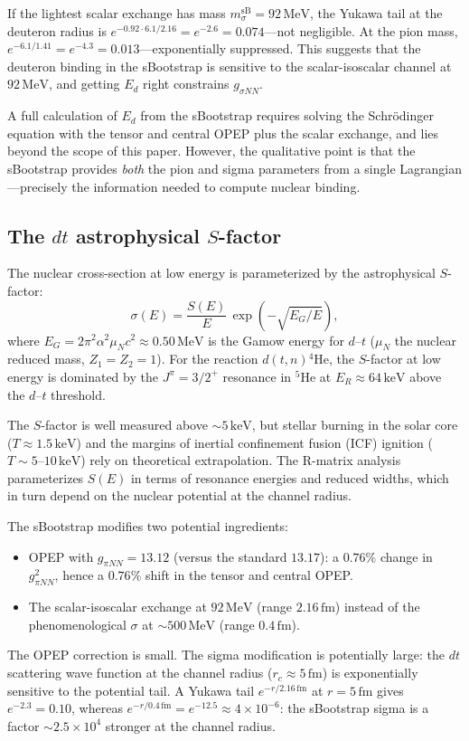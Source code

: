 \documentclass[12pt,a4paper]{article}
\newcommand{\MeV}{\,\text{MeV}}
\newcommand{\keV}{\,\text{keV}}
\begin{document}
If the lightest scalar exchange has mass $m_\sigma^{\text{sB}} = 92\MeV$,
the Yukawa tail at the deuteron radius is $e^{-0.92 \cdot 6.1/2.16}
= e^{-2.6} = 0.074$---not negligible.  At the pion mass,
$e^{-6.1/1.41} = e^{-4.3} = 0.013$---exponentially suppressed.
This suggests that the deuteron binding in the sBootstrap is sensitive
to the scalar-isoscalar channel at $92\MeV$, and getting $E_d$ right
constrains $g_{\sigma NN}$.

A full calculation of $E_d$ from the sBootstrap requires solving the
Schr\"odinger equation with the tensor and central OPEP plus the
scalar exchange, and lies beyond the scope of this paper.  However,
the qualitative point is that the sBootstrap provides \emph{both}
the pion and sigma parameters from a single Lagrangian---precisely the
information needed to compute nuclear binding.

\subsection{The $dt$ astrophysical $S$-factor}

The nuclear cross-section at low energy is parameterized by the
astrophysical $S$-factor:
\begin{equation}
  \sigma(E) = \frac{S(E)}{E}\,\exp\!\left(-\sqrt{E_G/E}\right),
\end{equation}
where $E_G = 2\pi^2 \alpha^2 \mu_N c^2 \approx 0.50\MeV$ is the
Gamow energy for $d$--$t$ ($\mu_N$ the nuclear reduced mass,
$Z_1 = Z_2 = 1$).  For the reaction
$d(t,n){}^4\text{He}$, the $S$-factor at low energy is dominated
by the $J^\pi = 3/2^+$ resonance in ${}^5\text{He}$ at
$E_R \approx 64\keV$ above the $d$--$t$ threshold.

The $S$-factor is well measured above $\sim 5\keV$, but stellar
burning in the solar core ($T \approx 1.5\keV$) and the margins of
inertial confinement fusion (ICF) ignition ($T \sim 5$--$10\keV$)
rely on theoretical extrapolation.  The R-matrix analysis
parameterizes $S(E)$ in terms of resonance energies and reduced
widths, which in turn depend on the nuclear potential at the
channel radius.

The sBootstrap modifies two potential ingredients:
\begin{itemize}
\item OPEP with $g_{\pi NN} = 13.12$ (versus the standard
  $13.17$): a $0.76\%$ change in $g_{\pi NN}^2$, hence a $0.76\%$
  shift in the tensor and central OPEP.
\item The scalar-isoscalar exchange at $92\MeV$ (range $2.16\,\text{fm}$)
  instead of the phenomenological $\sigma$ at $\sim 500\MeV$
  (range $0.4\,\text{fm}$).
\end{itemize}
The OPEP correction is small.  The sigma modification is potentially
large: the $dt$ scattering wave function at the channel radius
($r_c \approx 5\,\text{fm}$) is exponentially sensitive to the
potential tail.  A Yukawa tail $e^{-r/2.16\,\text{fm}}$ at
$r = 5\,\text{fm}$ gives $e^{-2.3} = 0.10$, whereas
$e^{-r/0.4\,\text{fm}} = e^{-12.5} \approx 4 \times 10^{-6}$:
the sBootstrap sigma is a factor $\sim 2.5 \times 10^4$ stronger
at the channel radius.
\end{document}
